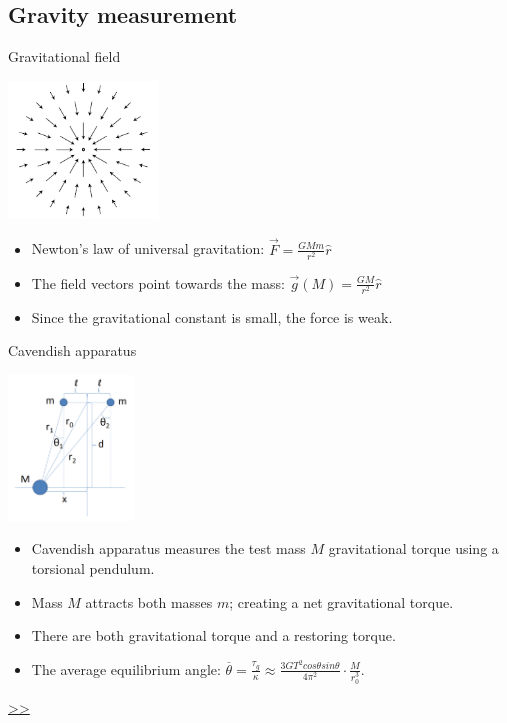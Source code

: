 \documentclass{beamer}
\begin{document}
\subsection{Gravity measurement}
\begin{frame}{\hypertarget{frame:Gravitational field}{Gravitational field}}
	\begin{center}		
		\includegraphics[width=0.3\textwidth,keepaspectratio]{gravity.png}
    \end{center}
	\begin{itemize}
		\item Newton's law of universal gravitation: $\overrightarrow{F} = \frac{GMm}{r^2}\hat{r}$
		\item The field vectors point towards the mass: $\overrightarrow{g}(M) = \frac{GM}{r^2}\hat{r}$ 
		\item Since the gravitational constant is small, the force is weak.
		\end{itemize}
\end{frame}
\begin{frame}{Cavendish apparatus}
	\begin{center}		
		\includegraphics[width=0.25\textwidth,keepaspectratio]{Cavendish apparatus.PNG}
    \end{center}
	\begin{itemize}
		\item Cavendish apparatus measures the test mass $M$ gravitational torque using a torsional pendulum.
		\pause
		\item Mass $M$ attracts both masses $m$; creating a net gravitational torque.
		\item There are both gravitational torque and a restoring torque.
		\pause
		\item The average equilibrium angle: $\overline{\theta} = \frac{\tau_g}{\kappa} \approx \frac{3GT^2cos\theta sin\theta}{4\pi^2 } \cdot \frac{M}{r_0^3}$.

	\end{itemize}
	\hyperlink{frame:Gravimetric sensing}{>>} 
\end{frame}
\end{document}
